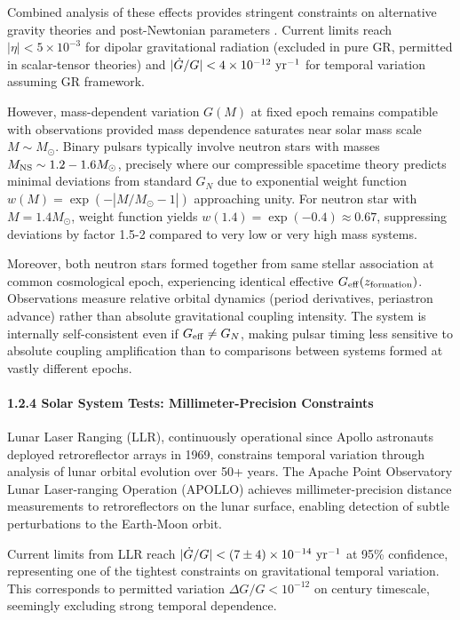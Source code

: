 \documentclass[10pt,a4paper]{article}
\begin{document}
Combined analysis of these effects provides stringent constraints on
alternative gravity theories and post-Newtonian parameters \cite{Will2014}. Current
limits reach \(|\eta| < 5 \times 10^{-3}\) for dipolar gravitational
radiation (excluded in pure GR, permitted in scalar-tensor theories) and
\(|\dot{G}/G| < 4 \times 10^{-12}~{\rm yr^{-1}}\) for temporal variation
assuming GR framework.

However, mass-dependent variation \(G(M)\) at fixed epoch remains
compatible with observations provided mass dependence saturates near
solar mass scale \(M \sim M_\odot\). Binary pulsars typically involve
neutron stars with masses \(M_{\rm NS} \sim 1.2-1.6 M_\odot\), precisely
where our compressible spacetime theory predicts minimal deviations from
standard \(G_N\) due to exponential weight function
\(w(M) = \exp(-|M/M_\odot - 1|)\) approaching unity. For neutron star
with \(M = 1.4 M_\odot\), weight function yields
\(w(1.4) = \exp(-0.4) \approx 0.67\), suppressing deviations by factor
1.5-2 compared to very low or very high mass systems.

Moreover, both neutron stars formed together from same stellar
association at common cosmological epoch, experiencing identical
effective \(G_{\rm eff}(z_{\rm formation})\). Observations measure
relative orbital dynamics (period derivatives, periastron advance)
rather than absolute gravitational coupling intensity. The system is
internally self-consistent even if \(G_{\rm eff} \neq G_N\), making
pulsar timing less sensitive to absolute coupling amplification than to
comparisons between systems formed at vastly different epochs.

\paragraph{1.2.4 Solar System Tests: Millimeter-Precision
Constraints}\label{solar-system-tests-millimeter-precision-constraints}

Lunar Laser Ranging (LLR), continuously operational since Apollo
astronauts deployed retroreflector arrays in 1969, constrains temporal
variation through analysis of lunar orbital evolution over 50+ years.
The Apache Point Observatory Lunar Laser-ranging Operation (APOLLO)
achieves millimeter-precision distance measurements to retroreflectors
on the lunar surface, enabling detection of subtle perturbations to the
Earth-Moon orbit.

Current limits from LLR reach
\(|\dot{G}/G| < (7 \pm 4) \times 10^{-14}~{\rm yr^{-1}}\) at 95\%
confidence, representing one of the tightest constraints on
gravitational temporal variation. This corresponds to permitted
variation \(\Delta G/G < 10^{-12}\) on century timescale, seemingly
excluding strong temporal dependence.
\end{document}
